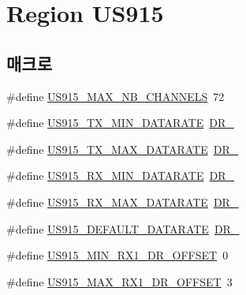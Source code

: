 \hypertarget{group___r_e_g_i_o_n_u_s915}{}\section{Region U\+S915}
\label{group___r_e_g_i_o_n_u_s915}
\subsection*{매크로}
\begin{DoxyCompactItemize}
\item 
\#define \mbox{\hyperlink{group___r_e_g_i_o_n_u_s915_ga417ab6531cbaef476634d7ba0b04c20f}{U\+S915\+\_\+\+M\+A\+X\+\_\+\+N\+B\+\_\+\+C\+H\+A\+N\+N\+E\+LS}}~72
\item 
\#define \mbox{\hyperlink{group___r_e_g_i_o_n_u_s915_ga82ad1f3ace520fc55727e442784bdcb6}{U\+S915\+\_\+\+T\+X\+\_\+\+M\+I\+N\+\_\+\+D\+A\+T\+A\+R\+A\+TE}}~\mbox{\hyperlink{group___r_e_g_i_o_n_ga6c4ef966b4f3d5eb7597b087f2b97095}{D\+R\+\_}}
\item 
\#define \mbox{\hyperlink{group___r_e_g_i_o_n_u_s915_gafe9e1c8956875cd7ccdb8aec59ee6f9d}{U\+S915\+\_\+\+T\+X\+\_\+\+M\+A\+X\+\_\+\+D\+A\+T\+A\+R\+A\+TE}}~\mbox{\hyperlink{group___r_e_g_i_o_n_ga6ceba6158a7dab238e9d0b846fb47a0c}{D\+R\+\_}}
\item 
\#define \mbox{\hyperlink{group___r_e_g_i_o_n_u_s915_ga44b4b0c33d7fbd6190937e2608b8ae71}{U\+S915\+\_\+\+R\+X\+\_\+\+M\+I\+N\+\_\+\+D\+A\+T\+A\+R\+A\+TE}}~\mbox{\hyperlink{group___r_e_g_i_o_n_ga44cc96ba80ae464cd9330b784d329c16}{D\+R\+\_}}
\item 
\#define \mbox{\hyperlink{group___r_e_g_i_o_n_u_s915_ga01e1ec534d6632367f457fac9488a1a2}{U\+S915\+\_\+\+R\+X\+\_\+\+M\+A\+X\+\_\+\+D\+A\+T\+A\+R\+A\+TE}}~\mbox{\hyperlink{group___r_e_g_i_o_n_ga226f47470cc69a6fe831f7c92709bc1f}{D\+R\+\_}}
\item 
\#define \mbox{\hyperlink{group___r_e_g_i_o_n_u_s915_ga30e4c5d41d52805a1ea76717e867d625}{U\+S915\+\_\+\+D\+E\+F\+A\+U\+L\+T\+\_\+\+D\+A\+T\+A\+R\+A\+TE}}~\mbox{\hyperlink{group___r_e_g_i_o_n_ga6c4ef966b4f3d5eb7597b087f2b97095}{D\+R\+\_}}
\item 
\#define \mbox{\hyperlink{group___r_e_g_i_o_n_u_s915_gac1d58ceae4ccf7be5aa7d89fa9cb9321}{U\+S915\+\_\+\+M\+I\+N\+\_\+\+R\+X1\+\_\+\+D\+R\+\_\+\+O\+F\+F\+S\+ET}}~0
\item 
\#define \mbox{\hyperlink{group___r_e_g_i_o_n_u_s915_gab5445433062754a147e74e8c325aa3b9}{U\+S915\+\_\+\+M\+A\+X\+\_\+\+R\+X1\+\_\+\+D\+R\+\_\+\+O\+F\+F\+S\+ET}}~3

\end{DoxyCompactItemize}
